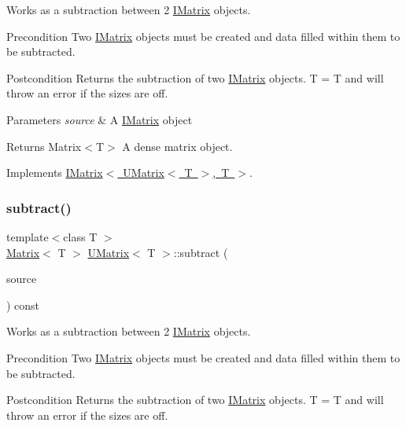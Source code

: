 Works as a subtraction between 2 \mbox{\hyperlink{class_i_matrix}{I\+Matrix}} objects. 

\begin{DoxyPrecond}{Precondition}
Two \mbox{\hyperlink{class_i_matrix}{I\+Matrix}} objects must be created and data filled within them to be subtracted. 
\end{DoxyPrecond}
\begin{DoxyPostcond}{Postcondition}
Returns the subtraction of two \mbox{\hyperlink{class_i_matrix}{I\+Matrix}} objects. T = T and will throw an error if the sizes are off.
\end{DoxyPostcond}

\begin{DoxyParams}{Parameters}
{\em source} & A \mbox{\hyperlink{class_i_matrix}{I\+Matrix}} object \\
\hline
\end{DoxyParams}
\begin{DoxyReturn}{Returns}
Matrix$<$\+T$>$ A dense matrix object. 
\end{DoxyReturn}


Implements \mbox{\hyperlink{class_i_matrix_a0bf5046efed75799656059ce2980a851}{I\+Matrix$<$ U\+Matrix$<$ T $>$, T $>$}}.

\mbox{\label{class_u_matrix_a10f1e6de36286b21e1a18a11ad013163}} 
\subsubsection{\texorpdfstring{subtract()}{subtract()}\hspace{0.1cm}{\footnotesize\ttfamily [5/6]}}
{\footnotesize\ttfamily template$<$class T $>$ \\
\mbox{\hyperlink{class_matrix}{Matrix}}$<$ T $>$ \mbox{\hyperlink{class_u_matrix}{U\+Matrix}}$<$ T $>$\+::subtract (\begin{DoxyParamCaption}\item[{const \mbox{\hyperlink{class_i_matrix}{I\+Matrix}}$<$ \mbox{\hyperlink{class_s_matrix}{S\+Matrix}}$<$ T $>$, T $>$ \&}]{source }\end{DoxyParamCaption}) const}



Works as a subtraction between 2 \mbox{\hyperlink{class_i_matrix}{I\+Matrix}} objects. 

\begin{DoxyPrecond}{Precondition}
Two \mbox{\hyperlink{class_i_matrix}{I\+Matrix}} objects must be created and data filled within them to be subtracted. 
\end{DoxyPrecond}
\begin{DoxyPostcond}{Postcondition}
Returns the subtraction of two \mbox{\hyperlink{class_i_matrix}{I\+Matrix}} objects. T = T and will throw an error if the sizes are off.
\end{DoxyPostcond}

